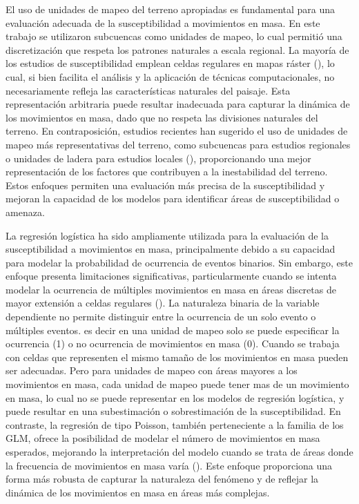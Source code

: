 \documentclass[
  manuscript=article,  
  layout=preprint,  
]{format}
\begin{document}
El uso de unidades de mapeo del terreno apropiadas es fundamental para una evaluación adecuada de la susceptibilidad a movimientos en masa. En este trabajo se utilizaron subcuencas como unidades de mapeo, lo cual permitió una discretización que respeta los patrones naturales a escala regional. La mayoría de los estudios de susceptibilidad emplean celdas regulares en mapas ráster (\cite{arnone2016effect}), lo cual, si bien facilita el análisis y la aplicación de técnicas computacionales, no necesariamente refleja las características naturales del paisaje.  Esta representación arbitraria puede resultar inadecuada para capturar la dinámica de los movimientos en masa, dado que no respeta las divisiones naturales del terreno. En contraposición, estudios recientes han sugerido el uso de unidades de mapeo más representativas del terreno, como subcuencas para estudios regionales o unidades de ladera para estudios locales (\cite{erener2012landslide}), proporcionando una mejor representación de los factores que contribuyen a la inestabilidad del terreno. Estos enfoques permiten una evaluación más precisa de la susceptibilidad y mejoran la capacidad de los modelos para identificar áreas de susceptibilidad o amenaza.

La regresión logística ha sido ampliamente utilizada para la evaluación de la susceptibilidad a movimientos en masa, principalmente debido a su capacidad para modelar la probabilidad de ocurrencia de eventos binarios. Sin embargo, este enfoque presenta limitaciones significativas, particularmente cuando se intenta modelar la ocurrencia de múltiples movimientos en masa en áreas discretas de mayor extensión a celdas regulares ()\cite{lombardo2018point}. La naturaleza binaria de la variable dependiente no permite distinguir entre la ocurrencia de un solo evento o múltiples eventos. es decir en una unidad de mapeo solo se puede especificar la ocurrencia (1) o no ocurrencia de movimientos en masa (0). Cuando se trabaja con celdas que representen el mismo tamaño de los movimientos en masa pueden ser adecuadas. Pero para unidades de mapeo con áreas mayores a los movimientos en masa, cada unidad de mapeo puede tener mas de un movimiento en masa, lo cual no se puede representar en los modelos de regresión logística, y puede resultar en una subestimación o sobrestimación de la susceptibilidad. En contraste, la regresión de tipo Poisson, también perteneciente a la familia de los GLM, ofrece la posibilidad de modelar el número de movimientos en masa esperados, mejorando la interpretación del modelo cuando se trata de áreas donde la frecuencia de movimientos en masa varía (\cite{lombardo2020space}). Este enfoque proporciona una forma más robusta de capturar la naturaleza del fenómeno y de reflejar la dinámica de los movimientos en masa en áreas más complejas.
\end{document}

